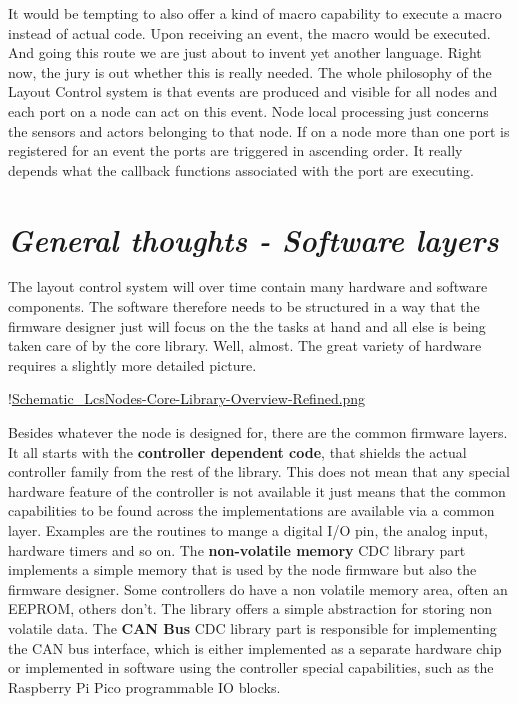 It would be tempting to also offer a kind of macro capability to execute a macro instead of actual code. Upon receiving an event, the macro would be executed. And going this route we are just about to invent yet another language. Right now, the jury is out whether this is really needed. The whole philosophy of the Layout Control system is that events are produced and visible for all nodes and each port on a node can act on this event. Node local processing just concerns the sensors and actors belonging to that node. If on a node more than one port is registered for an event the ports are triggered in ascending order. It really depends what the callback functions associated with the port are executing.

\section{\textit{General thoughts - Software layers}}

The layout control system will over time contain many hardware and software components. The software therefore needs to be structured in a way that the firmware designer just will focus on the the tasks at hand and all else is being taken care of by the core library. Well, almost. The great variety of hardware requires a slightly more detailed picture.

!\href{./Figures/Schematic_LcsNodes-Core-Library-Overview-Refined.png }{Schematic_LcsNodes-Core-Library-Overview-Refined.png}

Besides whatever the node is designed for, there are the common firmware layers. It all starts with the \textbf{controller dependent code}, that shields the actual controller family from the rest of the library. This does not mean that any special hardware feature of the controller is not available it just means that the common capabilities to be found across the implementations are available via a common layer. Examples are the routines to mange a digital I/O pin, the analog input, hardware timers and so on. The \textbf{non-volatile memory} CDC library part implements a simple memory that is used by the node firmware but also the firmware designer. Some controllers do have a non volatile memory area, often an EEPROM, others don't. The library offers a simple abstraction for storing non volatile data. The \textbf{ CAN Bus} CDC library part is responsible for implementing the CAN bus interface, which is either implemented as a separate hardware chip or implemented in software using the controller special capabilities, such as the Raspberry Pi Pico programmable IO blocks.

